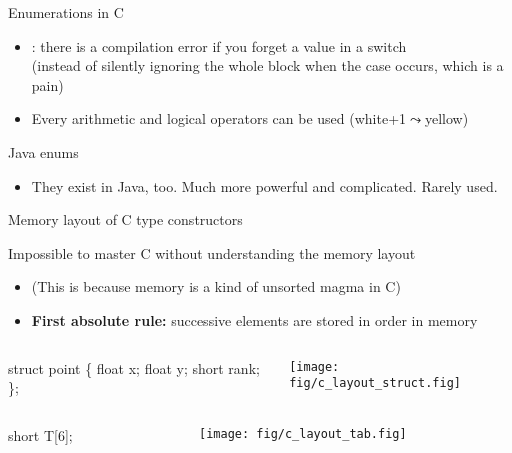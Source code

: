 \begin{Coupe}
\begin{frame}[fragile]{Enumerations in C}
    \begin{itemize}
    \item {}: there is a compilation error if you forget a value in a switch\\
      {\small(instead of silently ignoring the whole block when the case
        occurs, which is a pain)}
    \item Every arithmetic and logical operators can be used (white+1$\leadsto$yellow)
    \end{itemize}
  \begin{block}{Java enums}
    \begin{itemize}
    \item They exist in Java, too. Much more powerful and complicated. Rarely used.
    \end{itemize}
  \end{block}
\end{frame}
\begin{frame}[fragile]{Memory layout of C type constructors}
  \begin{block}{Impossible to master C without understanding the memory layout}
    \begin{itemize}
    \item (This is because memory is a kind of unsorted magma in C)
    \item \alert{\textbf{First absolute rule:}} successive elements are stored in order in memory
    \end{itemize}
    \begin{columns}
      \begin{column}{.3\linewidth}
        \begin{boitecode}{}
struct point \{
  float x;
  float y;
  short rank;    \};                  
        \end{boitecode}
      \end{column}
      \begin{column}{.6\linewidth}
        \texttt{[image: fig/c\_layout\_struct.fig]}
      \end{column}
    \end{columns}

    \begin{columns}
      \begin{column}{.3\linewidth}
        \begin{boitecode}{}
short T[6]; 
        \end{boitecode}
      \end{column}
      \begin{column}[t]{.6\linewidth}
        \texttt{[image: fig/c\_layout\_tab.fig]}
      \end{column}
    \end{columns}
    

\end{block}
\end{frame}
\end{Coupe}
